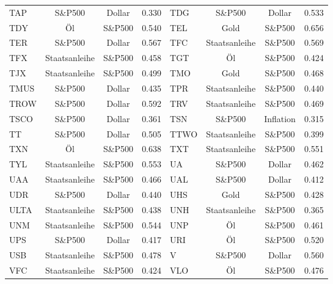 \begin{longtable}{l c c c | l c c c}
    TAP    & S\&P500       & Dollar    & 0.330         & TDG    & S\&P500       & Dollar    & 0.533         \\
    TDY    & Öl            & S\&P500   & 0.540         & TEL    & Gold          & S\&P500   & 0.656         \\
    TER    & S\&P500       & Dollar    & 0.567         & TFC    & Staatsanleihe & S\&P500   & 0.569         \\
    TFX    & Staatsanleihe & S\&P500   & 0.458         & TGT    & Öl            & S\&P500   & 0.424         \\
    TJX    & Staatsanleihe & S\&P500   & 0.499         & TMO    & Gold          & S\&P500   & 0.468         \\
    TMUS   & S\&P500       & Dollar    & 0.435         & TPR    & Staatsanleihe & S\&P500   & 0.440         \\
    TROW   & S\&P500       & Dollar    & 0.592         & TRV    & Staatsanleihe & S\&P500   & 0.469         \\
    TSCO   & S\&P500       & Dollar    & 0.361         & TSN    & S\&P500       & Inflation & 0.315         \\
    TT     & S\&P500       & Dollar    & 0.505         & TTWO   & Staatsanleihe & S\&P500   & 0.399         \\
    TXN    & Öl            & S\&P500   & 0.638         & TXT    & Staatsanleihe & S\&P500   & 0.551         \\
    TYL    & Staatsanleihe & S\&P500   & 0.553         & UA     & S\&P500       & Dollar    & 0.462         \\
    UAA    & Staatsanleihe & S\&P500   & 0.466         & UAL    & S\&P500       & Dollar    & 0.412         \\
    UDR    & S\&P500       & Dollar    & 0.440         & UHS    & Gold          & S\&P500   & 0.428         \\
    ULTA   & Staatsanleihe & S\&P500   & 0.438         & UNH    & Staatsanleihe & S\&P500   & 0.365         \\
    UNM    & Staatsanleihe & S\&P500   & 0.544         & UNP    & Öl            & S\&P500   & 0.461         \\
    UPS    & S\&P500       & Dollar    & 0.417         & URI    & Öl            & S\&P500   & 0.520         \\
    USB    & Staatsanleihe & S\&P500   & 0.478         & V      & S\&P500       & Dollar    & 0.560         \\
    VFC    & Staatsanleihe & S\&P500   & 0.424         & VLO    & Öl            & S\&P500   & 0.476         \\

\end{longtable}
